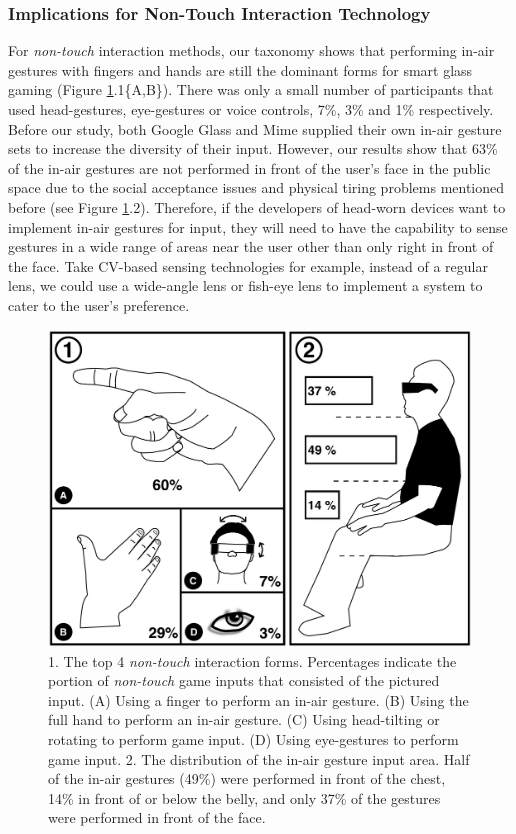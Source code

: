 \documentclass{sigchi}
\begin{document}
    \subsubsection{Implications for Non-Touch Interaction Technology}
    For \emph{non-touch} interaction methods, our taxonomy shows that performing in-air gestures with fingers and hands are still the dominant forms for smart glass gaming (Figure \ref{fig:figureInAirPorpotion}.1\{A,B\}). There was only a small number of participants that used head-gestures, eye-gestures or voice controls, 7\%, 3\% and 1\% respectively.
    Before our study, both Google Glass and Mime\cite{GoogleGlass, Colaco:2013:MCL:2501988.2502042} supplied their own in-air gesture sets to increase the diversity of their input. However, our results show that 63\% of the in-air gestures are not performed in front of the user's face in the public space due to the social acceptance issues and physical tiring problems mentioned before (see Figure \ref{fig:figureInAirPorpotion}.2). Therefore, if the developers of head-worn devices want to implement in-air gestures for input, they will need to have the capability to sense gestures in a wide range of areas near the user other than only right in front of the face. Take CV-based sensing technologies for example, instead of a regular lens, we could use a wide-angle lens or fish-eye lens to implement a system to cater to the user's preference.   
  \begin{figure}[!h]
  \centering
  \includegraphics[width=0.9\columnwidth]{InAirControlArea.pdf}
  \caption{1. The top 4 \emph{non-touch} interaction forms. Percentages indicate the portion of \emph{non-touch} game inputs that consisted of the pictured input. (A) Using a finger to perform an in-air gesture. (B) Using the full hand to perform an in-air gesture. (C) Using head-tilting or rotating to perform game input. (D) Using eye-gestures to perform game input. 2. The distribution of the in-air gesture input area. Half of the in-air gestures (49\%) were performed in front of the chest, 14\% in front of or below the belly, and only 37\% of the gestures were performed in front of the face.}
  \label{fig:figureInAirPorpotion}
  \end{figure}
\end{document}
